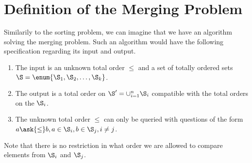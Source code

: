 \section{Definition of the Merging Problem}
\label{tree:merging:def}

Similarily to the sorting problem, we can imagine that we have an algorithm
solving the merging problem. Such an algorithm would have the following
specification regarding its input and output.

\begin{enumerate}
\item The input is an unknown total order \(\le\) and a set of totally ordered
sets \(\S = \enum{\S_1, \S_2, \ldots, \S_k}\).
\item The output is a total order on \(\S' = \cup_{i=1}^{n} \S_i\) compatible with
the total orders on the \(\S_i\).
\item The unknown total order \(\le\) can only be queried with questions of the
form \(a \ask{\le} b, a \in \S_i, b \in \S_j, i \neq j\).
\end{enumerate}

Note that there is no restriction in what order we are allowed to compare
elements from \(\S_i\) and \(\S_j\).

